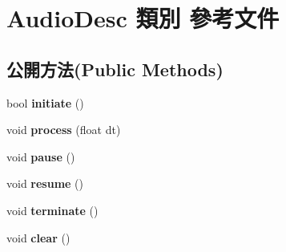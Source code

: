 \hypertarget{class_audio_desc}{}\section{Audio\+Desc 類別 參考文件}
\label{class_audio_desc}
\subsection*{公開方法(Public Methods)}
\begin{DoxyCompactItemize}
\item 
bool {\bfseries initiate} ()\hypertarget{class_audio_desc_a1f76a0d80b5f6566a129db3fefb26fe2}{}\label{class_audio_desc_a1f76a0d80b5f6566a129db3fefb26fe2}

\item 
void {\bfseries process} (float dt)\hypertarget{class_audio_desc_a29fdeb8c0d95ba029de39155b3ffac82}{}\label{class_audio_desc_a29fdeb8c0d95ba029de39155b3ffac82}

\item 
void {\bfseries pause} ()\hypertarget{class_audio_desc_a7a9448b6f00df9fde9a9c868792483c6}{}\label{class_audio_desc_a7a9448b6f00df9fde9a9c868792483c6}

\item 
void {\bfseries resume} ()\hypertarget{class_audio_desc_a2cfb964985dc65f8684ca6b74a3873de}{}\label{class_audio_desc_a2cfb964985dc65f8684ca6b74a3873de}

\item 
void {\bfseries terminate} ()\hypertarget{class_audio_desc_a9dea39ccc6c37a519fd7493b2d801011}{}\label{class_audio_desc_a9dea39ccc6c37a519fd7493b2d801011}

\item 
void {\bfseries clear} ()\hypertarget{class_audio_desc_ac7a8949c98471a8c7799ace8dacc2762}{}\label{class_audio_desc_ac7a8949c98471a8c7799ace8dacc2762}

\end{DoxyCompactItemize}

